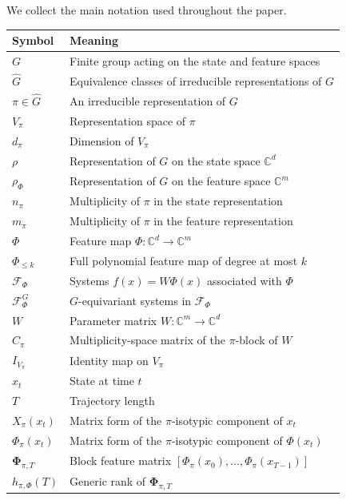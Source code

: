\documentclass[11pt]{article}
\theoremstyle{plain}
\theoremstyle{definition}
\theoremstyle{remark}
\begin{document}
We collect the main notation used throughout the paper. 

\begin{table}[h]
\centering
\small
\begin{tabular}{ll}
\toprule
Symbol & Meaning \\
\midrule
\(G\) & Finite group acting on the state and feature spaces \\
\(\widehat G\) & Equivalence classes of irreducible representations of \(G\) \\
\(\pi\in\widehat G\) & An irreducible representation of \(G\) \\
\(V_\pi\) & Representation space of \(\pi\) \\
\(d_\pi\) & Dimension of \(V_\pi\) \\
\(\rho\) & Representation of \(G\) on the state space \(\mathbb C^d\) \\
\(\rho_\Phi\) & Representation of \(G\) on the feature space \(\mathbb C^m\) \\
\(n_\pi\) & Multiplicity of \(\pi\) in the state representation \\
\(m_\pi\) & Multiplicity of \(\pi\) in the feature representation \\
\(\Phi\) & Feature map \(\Phi:\mathbb C^d\to\mathbb C^m\) \\
\(\Phi_{\le k}\) & Full polynomial feature map of degree at most \(k\) \\
\(\mathcal F_\Phi\) & Systems \(f(x)=W\Phi(x)\) associated with \(\Phi\) \\
\(\mathcal F_\Phi^G\) & \(G\)-equivariant systems in \(\mathcal F_\Phi\) \\
\(W\) & Parameter matrix \(W:\mathbb C^m\to\mathbb C^d\) \\
\(C_\pi\) & Multiplicity-space matrix of the \(\pi\)-block of \(W\) \\
\(I_{V_\pi}\) & Identity map on \(V_\pi\) \\
\(x_t\) & State at time \(t\) \\
\(T\) & Trajectory length \\
\(X_\pi(x_t)\) & Matrix form of the \(\pi\)-isotypic component of \(x_t\) \\
\(\Phi_\pi(x_t)\) & Matrix form of the \(\pi\)-isotypic component of \(\Phi(x_t)\) \\
\(\mathbf{\Phi}_{\pi,T}\) &
Block feature matrix \([\Phi_\pi(x_0),\ldots,\Phi_\pi(x_{T-1})]\) \\
\(h_{\pi,\Phi}(T)\) & Generic rank of \(\mathbf{\Phi}_{\pi,T}\) \\

\end{tabular}
\end{table}
\end{document}
